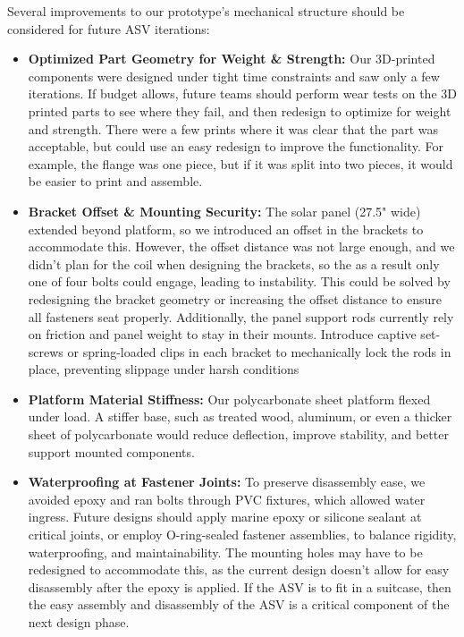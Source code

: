 Several improvements to our prototype's mechanical structure should be considered for future ASV iterations:
\begin{itemize}
  \item \textbf{Optimized Part Geometry for Weight \& Strength:}  
    Our 3D-printed components were designed under tight time constraints and saw only a few iterations. If budget allows, future teams should perform wear tests on the 3D printed parts to see where they fail, and then redesign to optimize for weight and strength. There were a few prints where it was clear that the part was acceptable, but could use an easy redesign to improve the functionality. For example, the flange was one piece, but if it was split into two pieces, it would be easier to print and assemble.
  \item \textbf{Bracket Offset \& Mounting Security:}  
    The solar panel (27.5" wide) extended beyond platform, so we introduced an offset in the brackets to accommodate this. However, the offset distance was not large enough, and we didn't plan for the coil when designing the brackets, so the as a result only one of four bolts could engage, leading to instability. This could be solved by redesigning the bracket geometry or increasing the offset distance to ensure all fasteners seat properly. Additionally, the panel support rods currently rely on friction and panel weight to stay in their mounts. Introduce captive set-screws or spring-loaded clips in each bracket to mechanically lock the rods in place, preventing slippage under harsh conditions    
  \item \textbf{Platform Material Stiffness:}  
    Our polycarbonate sheet platform flexed under load. A stiffer base, such as treated wood, aluminum, or even a thicker sheet of polycarbonate would reduce deflection, improve stability, and better support mounted components.
  \item \textbf{Waterproofing at Fastener Joints:}  
    To preserve disassembly ease, we avoided epoxy and ran bolts through PVC fixtures, which allowed water ingress. Future designs should apply marine epoxy or silicone sealant at critical joints, or employ O-ring-sealed fastener assemblies, to balance rigidity, waterproofing, and maintainability. The mounting holes may have to be redesigned to accommodate this, as the current design doesn't allow for easy disassembly after the epoxy is applied. If the ASV is to fit in a suitcase, then the easy assembly and disassembly of the ASV is a critical component of the next design phase. 
\end{itemize}

